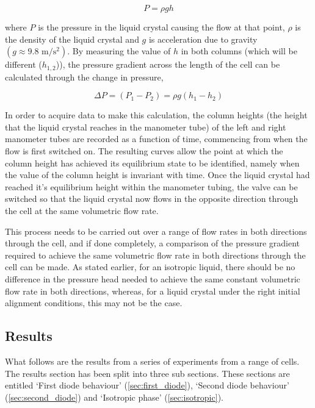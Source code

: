 \begin{equation}
P=\rho gh
\end{equation}

\noindent where $P$ is the pressure in the liquid crystal causing the flow at that point, $\rho$ is the density of the liquid crystal and $g$ is acceleration due to gravity $\left(g\approx9.8 \text{ m/s$^2$}\right)$. By measuring the value of $h$ in both columns (which will be different ($h_{1,2}$)), the pressure gradient across the length of the cell can be calculated through the change in pressure,

\begin{equation}
\Delta P=\left(P_1-P_2\right)=\rho g \left(h_1-h_2\right)
\label{eq:pressures}
\end{equation}

In order to acquire data to make this calculation, the column heights (the height that the liquid crystal reaches in the manometer tube) of the left and right manometer tubes are recorded as a function of time, commencing from when the flow is first switched on. The resulting curves allow the point at which the column height has achieved its equilibrium state to be identified, namely when the value of the column height is invariant with time. Once the liquid crystal had reached it's equilibrium height within the manometer tubing, the valve can be switched so that the liquid crystal now flows in the opposite direction through the cell at the same volumetric flow rate.

This process needs to be carried out over a range of flow rates in both directions through the cell, and if done completely, a comparison of the pressure gradient required to achieve the same volumetric flow rate in both directions through the cell can be made. As stated earlier, for an isotropic liquid, there should be no difference in the pressure head needed to achieve the same constant volumetric flow rate in both directions, whereas, for a liquid crystal under the right initial alignment conditions, this may not be the case.



\subsection{Results}
What follows are the results from a series of experiments from a range of cells. The results section has been split into three sub sections. These sections are entitled `First diode behaviour' (\ref{sec:first_diode}), `Second diode behaviour' (\ref{sec:second_diode}) and `Isotropic phase' (\ref{sec:isotropic}).


